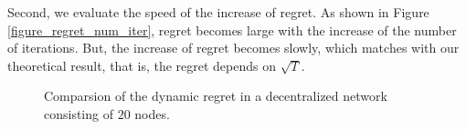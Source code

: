 \documentclass{article}
\begin{document}
Second, we evaluate the speed of the increase of regret. As shown in Figure \ref{figure_regret_num_iter}, regret becomes large with the increase of the number of iterations. But, the increase of regret becomes slowly, which matches with our theoretical result, that is, the regret depends on $\sqrt{T}$.



\begin{figure*}[!h]
\setlength{\abovecaptionskip}{0pt}
\setlength{\belowcaptionskip}{0pt}
\centering 
{}
\caption{Comparsion of the dynamic regret in a decentralized network consisting of $20$ nodes.}
\label{figure_synthetic_regret}
\end{figure*}
\end{document}
